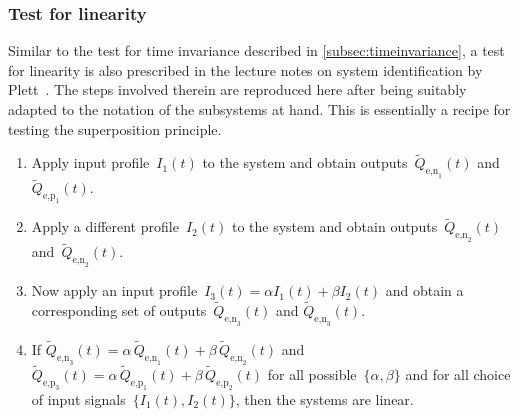 \subsubsection*{Test for linearity}
Similar     to      the     test      for     time      invariance     described
in \cref{subsec:timeinvariance}, a  test for linearity is  also prescribed in
the lecture notes on  system identification by Plett~\cite{PlettECE5560_02}. The
steps involved therein  are reproduced here after being suitably  adapted to the
notation of the subsystems at hand. This is essentially a recipe for testing the
superposition principle.
\begin{enumerate}[topsep=-3pt,itemsep=1pt,partopsep=-3pt, parsep=1pt]
    \item Apply input profile~$I_1(t)$ to the system and obtain outputs~$\widetilde{Q}_{\text{e,n}_1}\!(t)$ and~$\widetilde{Q}_{\text{e,p}_1}\!(t)$.
    \item Apply a different profile~$I_2(t)$ to the system and obtain outputs~$\widetilde{Q}_{\text{e,n}_2}\!(t)$ and~$\widetilde{Q}_{\text{e,n}_2}\!(t)$.
    \item Now apply an input profile~$I_3(t) = \alpha I_1(t) + \beta I_2(t)$ and obtain a corresponding set of outputs~$\widetilde{Q}_{\text{e,n}_3}\!(t)$ and $\widetilde{Q}_{\text{e,n}_3}\!(t)$.
    \item If ${\widetilde{Q}_{\text{e,n}_3}\!(t) = \alpha\,
            \widetilde{Q}_{\text{e,n}_1}\!(t) + \beta \,
            \widetilde{Q}_{\text{e,n}_2}\!(t)}$ and
            ${\widetilde{Q}_{\text{e,p}_3}\!(t) = \alpha\,
                \widetilde{Q}_{\text{e,p}_1}\!(t) + \beta \,
            \widetilde{Q}_{\text{e,p}_2}\!(t)}$ for all
            possible~$\{\alpha,\beta\}$ and for all choice of input signals~$\{I_1(t),I_2(t)\}$, then the systems are linear.
\end{enumerate}

